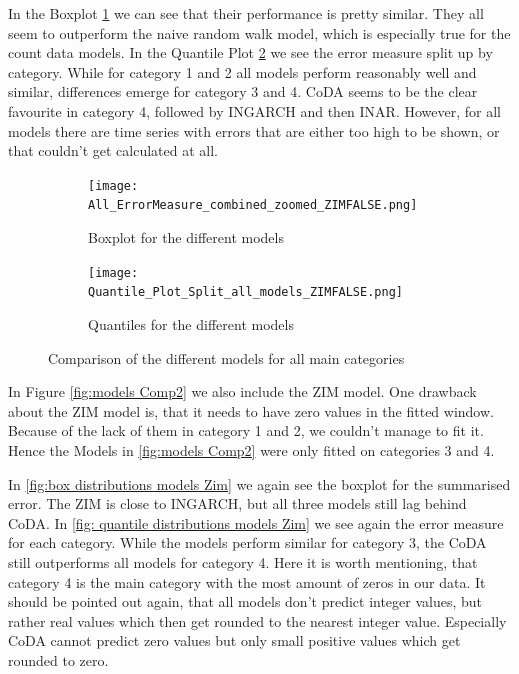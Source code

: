 In the Boxplot \ref{fig:box distributions models} we can see that their performance is pretty similar. They all seem to outperform the naive random walk model, which is especially true for the count data models. 
In the Quantile Plot \ref{fig: quantile distributions models} we see the error measure split up by category. While for category 1 and 2 all models perform reasonably well and similar, differences emerge for category 3 and 4. CoDA seems to be the clear favourite in category 4, followed by INGARCH and then INAR. However, for all models there are time series with errors that are either too high to be shown, or that couldn't get calculated at all. 
\begin{figure}[htb!]
\centering
\begin{subfigure}[b]{0.8\textwidth}
\texttt{[image: All\_ErrorMeasure\_combined\_zoomed\_ZIMFALSE.png]}
\caption{Boxplot for the different models}
\label{fig:box distributions models}
\end{subfigure}
\hfill
\begin{subfigure}[b]{0.8\textwidth}
\texttt{[image: Quantile\_Plot\_Split\_all\_models\_ZIMFALSE.png]}
\caption{Quantiles for the different models}
\label{fig: quantile distributions models}
\end{subfigure}
\hfill
\caption{Comparison of the different models for all main categories}
\label{fig:models Comp1}
\end{figure}

In Figure \ref{fig:models Comp2} we also include the ZIM model. One drawback about the ZIM model is, that it needs to have zero values in the fitted window. Because of the lack of them in category 1 and 2, we couldn't manage to fit it. Hence the Models in \ref{fig:models Comp2} were only fitted on categories 3 and 4. 

In \ref{fig:box distributions models Zim} we again see the boxplot for the summarised error. The ZIM is close to INGARCH, but all three models still lag behind CoDA. In \ref{fig: quantile distributions models Zim} we see again the error measure for each category. While the models perform similar for category 3, the CoDA still outperforms all models for category 4. Here it is worth mentioning, that category 4 is the main category with the most amount of zeros in our data. It should be pointed out again, that all models don't predict integer values, but rather real values which then get rounded to the nearest integer value. Especially CoDA cannot predict zero values but only small positive values which get rounded to zero.

